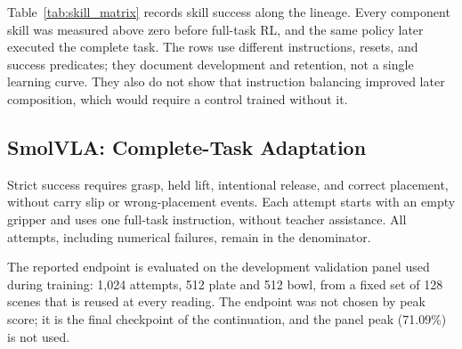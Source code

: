 Table~\ref{tab:skill_matrix} records skill success along the lineage. Every component skill was measured above zero before full-task RL, and the same policy later executed the complete task. The rows use different instructions, resets, and success predicates; they document development and retention, not a single learning curve. They also do not show that instruction balancing improved later composition, which would require a control trained without it.






\subsection{SmolVLA: Complete-Task Adaptation}\label{sec:cdpr_results}
Strict success requires grasp, held lift, intentional release, and correct placement, without carry slip or wrong-placement events. Each attempt starts with an empty gripper and uses one full-task instruction, without teacher assistance. All attempts, including numerical failures, remain in the denominator.

The reported endpoint is evaluated on the development validation panel used during training: 1,024 attempts, 512 plate and 512 bowl, from a fixed set of 128 scenes that is reused at every reading. The endpoint was not chosen by peak score; it is the final checkpoint of the continuation, and the panel peak (71.09\%) is not used.




